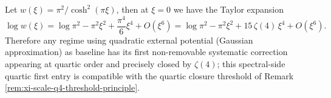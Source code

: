 \begin{remark}\label{rem:xi-hellinger-logw-zeta4-entry}
Let \(w(\xi)=\pi^2/\cosh^2(\pi\xi)\), then at \(\xi=0\) we have the Taylor expansion
\[
\log w(\xi)=\log\pi^2-\pi^2\xi^2+\frac{\pi^4}{6}\xi^4+O(\xi^6)
=\log\pi^2-\pi^2\xi^2+15\,\zeta(4)\,\xi^4+O(\xi^6).
\]
Therefore any regime using quadratic external potential (Gaussian approximation) as baseline has its first non-removable systematic correction appearing at quartic order and precisely closed by \(\zeta(4)\);
this spectral-side quartic first entry is compatible with the quartic closure threshold of Remark \ref{rem:xi-scale-q4-threshold-principle}.
\end{remark}


